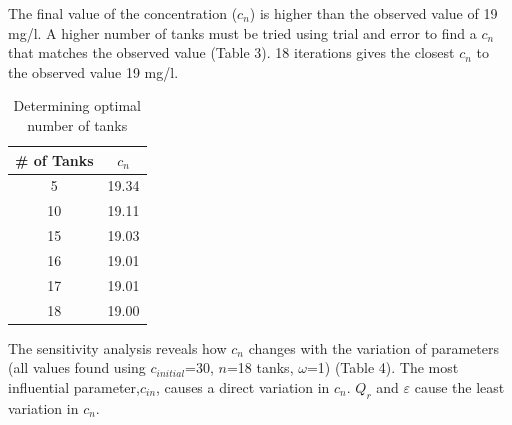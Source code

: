 \documentclass[titlepage,12pt]{article}
\begin{document}
The final value of the concentration ($c_{n}$) is higher than the
observed value of 19 mg/l.  A higher number of tanks must be tried
using trial and error to find a $c_{n}$ that matches the observed
value (Table 3).  18 iterations gives the closest $c_n$ to the
observed value 19 mg/l.
\begin{table}[h]
\begin{center}
\caption{Determining optimal number of tanks}
\begin{tabular}{|c|c|}
\hline
{\bf \# of Tanks} & {\bf $c_n$} \\
\hline
         5 &      19.34 \\
\hline
        10 &      19.11 \\
\hline
        15 &      19.03 \\
\hline
        16 &      19.01 \\
\hline
        17 &      19.01 \\
\hline
        18 &      19.00 \\
\hline
\end{tabular}
\end{center}
\end{table}

The sensitivity analysis reveals how $c_n$ changes with the
variation of parameters (all values found using
\underline{$c$}$_{initial}$=30, $n$=18 tanks, $\omega$=1) (Table 4).
The most influential parameter,$c_{in}$, causes a direct variation
in $c_n$. $Q_r$ and $\varepsilon$ cause the least variation in
$c_n$.
\end{document}

